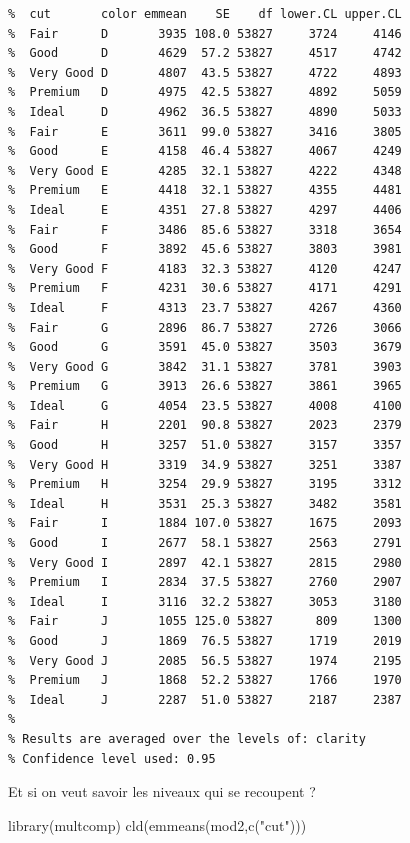 \documentclass[
]{article}
\newenvironment{Shaded}{\begin{snugshade}}{\end{snugshade}}
\newcommand{\FunctionTok}[1]{\textcolor[rgb]{0.00,0.00,0.00}{#1}}
\newcommand{\NormalTok}[1]{#1}
\newcommand{\StringTok}[1]{\textcolor[rgb]{0.31,0.60,0.02}{#1}}
\begin{document}
\begin{verbatim}
%  cut       color emmean    SE    df lower.CL upper.CL
%  Fair      D       3935 108.0 53827     3724     4146
%  Good      D       4629  57.2 53827     4517     4742
%  Very Good D       4807  43.5 53827     4722     4893
%  Premium   D       4975  42.5 53827     4892     5059
%  Ideal     D       4962  36.5 53827     4890     5033
%  Fair      E       3611  99.0 53827     3416     3805
%  Good      E       4158  46.4 53827     4067     4249
%  Very Good E       4285  32.1 53827     4222     4348
%  Premium   E       4418  32.1 53827     4355     4481
%  Ideal     E       4351  27.8 53827     4297     4406
%  Fair      F       3486  85.6 53827     3318     3654
%  Good      F       3892  45.6 53827     3803     3981
%  Very Good F       4183  32.3 53827     4120     4247
%  Premium   F       4231  30.6 53827     4171     4291
%  Ideal     F       4313  23.7 53827     4267     4360
%  Fair      G       2896  86.7 53827     2726     3066
%  Good      G       3591  45.0 53827     3503     3679
%  Very Good G       3842  31.1 53827     3781     3903
%  Premium   G       3913  26.6 53827     3861     3965
%  Ideal     G       4054  23.5 53827     4008     4100
%  Fair      H       2201  90.8 53827     2023     2379
%  Good      H       3257  51.0 53827     3157     3357
%  Very Good H       3319  34.9 53827     3251     3387
%  Premium   H       3254  29.9 53827     3195     3312
%  Ideal     H       3531  25.3 53827     3482     3581
%  Fair      I       1884 107.0 53827     1675     2093
%  Good      I       2677  58.1 53827     2563     2791
%  Very Good I       2897  42.1 53827     2815     2980
%  Premium   I       2834  37.5 53827     2760     2907
%  Ideal     I       3116  32.2 53827     3053     3180
%  Fair      J       1055 125.0 53827      809     1300
%  Good      J       1869  76.5 53827     1719     2019
%  Very Good J       2085  56.5 53827     1974     2195
%  Premium   J       1868  52.2 53827     1766     1970
%  Ideal     J       2287  51.0 53827     2187     2387
% 
% Results are averaged over the levels of: clarity 
% Confidence level used: 0.95
\end{verbatim}

Et si on veut savoir les niveaux qui se recoupent ?

\begin{Shaded}
\begin{Highlighting}[]
\FunctionTok{library}\NormalTok{(multcomp)}
\FunctionTok{cld}\NormalTok{(}\FunctionTok{emmeans}\NormalTok{(mod2,}\FunctionTok{c}\NormalTok{(}\StringTok{"cut"}\NormalTok{)))}
\end{Highlighting}
\end{Shaded}
\end{document}
